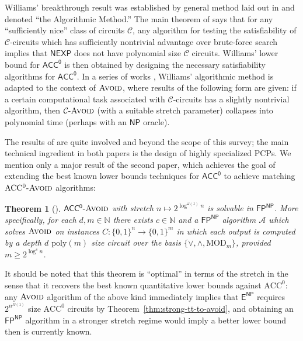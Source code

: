 \documentclass[11pt]{article}
\newtheorem{theorem}{Theorem}
\newcommand{\dash}{\text{-}}
\newcommand{\B}{\{0,1\}}
\newcommand{\poly}{\mathrm{poly}}
\newcommand{\avoid}{\textsc{Avoid}}
\begin{document}
Williams' breakthrough result was established by general method laid out in \cite{ryan-sat} and denoted ``the Algorithmic Method.'' The main theorem of \cite{ryan-sat} says that for any ``sufficiently nice'' class of circuits $\mathcal{C}$, any algorithm for testing the satisfiability of $\mathcal{C}$-circuits which has sufficiently nontrivial advantage over brute-force search implies that $\mathsf{NEXP}$ does not have polynomial size $\mathcal{C}$ circuits. Williams' lower bound for $\mathsf{ACC^0}$ is then obtained by designing the necessary satisfiability algorithms for $\mathsf{ACC^0}$.
In a series of works \cite{RSW,hard-partial}, Williams' algorithmic method is adapted to the context of $\avoid$, where results of the following form are given: if a certain computational task associated with $\mathcal{C}$-circuits has a slightly nontrivial algorithm, then $\mathcal{C}\dash\avoid$ (with a suitable stretch parameter) collapses into polynomial time (perhaps with an $\mathsf{NP}$ oracle). 

The results of \cite{RSW,hard-partial} are quite involved and beyond the scope of this survey; the main technical ingredient in both papers is the design of highly specialized PCPs. We mention only a major result of the second paper, which achieves the goal of extending the best known lower bounds techniques for $\mathsf{ACC^0}$ to achieve matching $\mathrm{ACC^0}\dash\avoid$ algorithms:
\begin{theorem}[\cite{hard-partial}]
$\mathsf{ACC^0}\dash \avoid$ with stretch $n \mapsto 2^{\log^{\omega(1)}n}$ is solvable in $\mathsf{FP^{NP}}$. More specifically, for each $d,m \in \mathbb{N}$ there exists $c \in \mathbb{N}$ and a $\mathsf{FP^{NP}}$ algorithm $\mathcal{A}$ which solves $\avoid$ on instances $C: \B^n \to \B^m$ in which each output is computed by a depth $d$ $\poly(m)$ size circuit over the basis $\{\lor, \land, \mathrm{MOD}_m\}$, provided $m \geq 2^{\log^cn}$.
\end{theorem}

It should be noted that this theorem is ``optimal'' in terms of the stretch in the sense that it recovers the best known quantitative lower bounds against $\mathrm{ACC^0}$: any $\avoid$ algorithm of the above kind immediately implies that $\mathsf{E^{NP}}$ requires $2^{n^{\Omega(1)}}$ size $\mathrm{ACC^0}$ circuits by Theorem~\ref{thm:strong-tt-to-avoid}, and obtaining an $\mathsf{FP^{NP}}$ algorithm in a stronger stretch regime would imply a better lower bound then is currently known.
\end{document}
